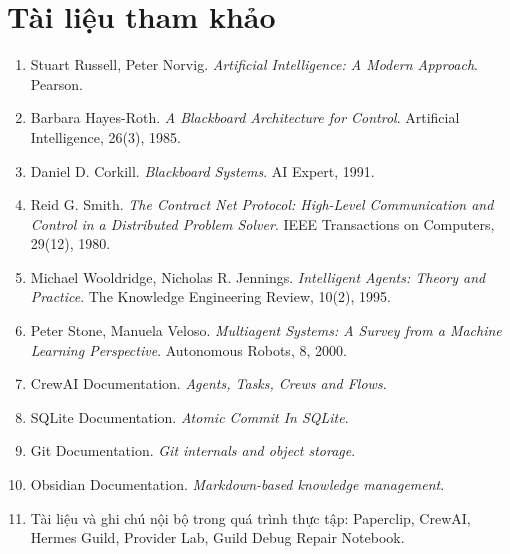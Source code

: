 \documentclass[12pt,a4paper]{article}
\begin{document}
\section*{Tài liệu tham khảo}
\begin{enumerate}
    \item Stuart Russell, Peter Norvig. \textit{Artificial Intelligence: A Modern Approach}. Pearson.
    \item Barbara Hayes-Roth. \textit{A Blackboard Architecture for Control}. Artificial Intelligence, 26(3), 1985.
    \item Daniel D. Corkill. \textit{Blackboard Systems}. AI Expert, 1991.
    \item Reid G. Smith. \textit{The Contract Net Protocol: High-Level Communication and Control in a Distributed Problem Solver}. IEEE Transactions on Computers, 29(12), 1980.
    \item Michael Wooldridge, Nicholas R. Jennings. \textit{Intelligent Agents: Theory and Practice}. The Knowledge Engineering Review, 10(2), 1995.
    \item Peter Stone, Manuela Veloso. \textit{Multiagent Systems: A Survey from a Machine Learning Perspective}. Autonomous Robots, 8, 2000.
    \item CrewAI Documentation. \textit{Agents, Tasks, Crews and Flows}.
    \item SQLite Documentation. \textit{Atomic Commit In SQLite}.
    \item Git Documentation. \textit{Git internals and object storage}.
    \item Obsidian Documentation. \textit{Markdown-based knowledge management}.
    \item Tài liệu và ghi chú nội bộ trong quá trình thực tập: Paperclip, CrewAI, Hermes Guild, Provider Lab, Guild Debug Repair Notebook.
\end{enumerate}
\end{document}
